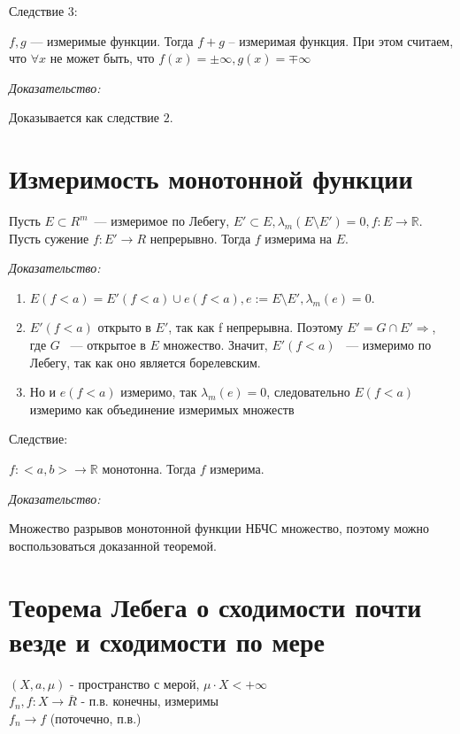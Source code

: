 \documentclass[paper=a4, fontsize=13.2pt]{article}
\begin{document}
Следствие $3$:

$f, g$ --- измеримые функции. Тогда $f + g$ -- измеримая функция. При этом считаем, что $\forall x$ не может быть, что $f(x) = \pm \infty, g(x) = \mp \infty$

\emph{Доказательство:}

Доказывается как следствие $2$.

\section{Измеримость монотонной функции}

Пусть $E \subset R^m$~--- измеримое по Лебегу, $E' \subset E, \lambda_m (E \setminus E') = 0, f: E \rightarrow \mathds{R}.$ Пусть сужение $f: E' \rightarrow R$ непрерывно. Тогда $f$ измерима на $E$.

\emph{Доказательство:}

\begin{enumerate}
	\item $E(f < a) = E'(f < a) \cup e(f < a), e:=E \setminus E', \lambda_m(e) = 0$.
	\item $ E'(f < a)$ открыто в $E'$, так как f непрерывна. Поэтому $E' = G \cap E' \Rightarrow$, где $G$ ~--- открытое в $E$ множество.  Значит, $E'(f<a)$ ~--- измеримо по Лебегу, так как оно является борелевским.
	\item Но и $e(f<a)$ измеримо, так $\lambda_m(e) = 0$, следовательно $E(f < a)$ измеримо как объединение измеримых множеств
\end{enumerate}

Следствие:

$f: <a, b> \rightarrow \mathds{R}$ монотонна. Тогда $f$ измерима.

\emph{Доказательство:}

Множество разрывов монотонной функции НБЧС множество, поэтому можно воспользоваться доказанной теоремой.

\section{Теорема Лебега о сходимости почти везде и сходимости по мере}

$(X, a, \mu)$ - пространство с мерой, $\mu \cdot X < +\infty$ \\
$f_n , f : X \rightarrow \overline R$ - п.в. конечны, измеримы \\
$f_n \rightarrow f$ (поточечно, п.в.)
\end{document}

